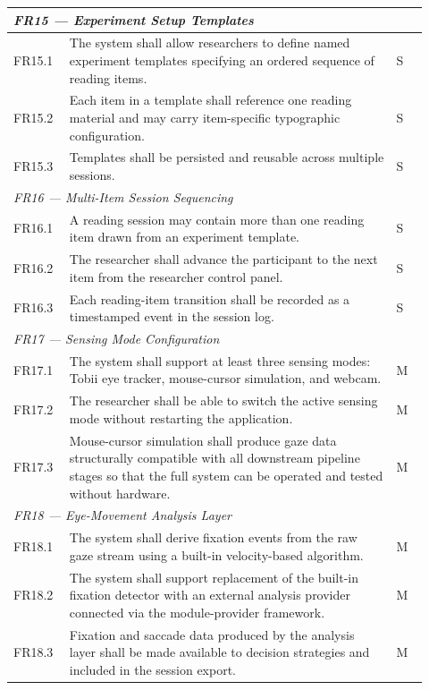 \begin{longtable}{%
  p{0.12\linewidth}
  p{0.73\linewidth}
  p{0.07\linewidth}
}
\multicolumn{3}{l}{\textit{FR15 — Experiment Setup Templates}} \\
\midrule
FR15.1 & The system shall allow researchers to define named experiment
         templates specifying an ordered sequence of reading items. & S \\
FR15.2 & Each item in a template shall reference one reading material and
         may carry item-specific typographic configuration. & S \\
FR15.3 & Templates shall be persisted and reusable across multiple sessions. & S \\
\midrule

\multicolumn{3}{l}{\textit{FR16 — Multi-Item Session Sequencing}} \\
\midrule
FR16.1 & A reading session may contain more than one reading item drawn
         from an experiment template. & S \\
FR16.2 & The researcher shall advance the participant to the next item from
         the researcher control panel. & S \\
FR16.3 & Each reading-item transition shall be recorded as a timestamped
         event in the session log. & S \\
\midrule

\multicolumn{3}{l}{\textit{FR17 — Sensing Mode Configuration}} \\
\midrule
FR17.1 & The system shall support at least three sensing modes: Tobii eye
         tracker, mouse-cursor simulation, and webcam. & M \\
FR17.2 & The researcher shall be able to switch the active sensing mode
         without restarting the application. & M \\
FR17.3 & Mouse-cursor simulation shall produce gaze data structurally
         compatible with all downstream pipeline stages so that the
         full system can be operated and tested without hardware. & M \\
\midrule

\multicolumn{3}{l}{\textit{FR18 — Eye-Movement Analysis Layer}} \\
\midrule
FR18.1 & The system shall derive fixation events from the raw gaze stream
         using a built-in velocity-based algorithm. & M \\
FR18.2 & The system shall support replacement of the built-in fixation
         detector with an external analysis provider connected via the
         module-provider framework. & M \\
FR18.3 & Fixation and saccade data produced by the analysis layer shall
         be made available to decision strategies and included in the
         session export. & M \\
\midrule


\end{longtable}
